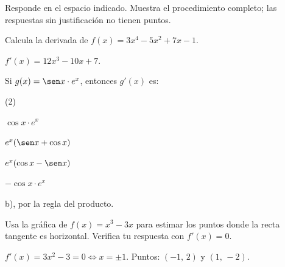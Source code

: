 \documentclass[11pt]{article}
\begin{document}
\encabezado

\begin{instrucciones}
Responde en el espacio indicado. Muestra el procedimiento completo;
las respuestas sin justificación no tienen puntos.
\end{instrucciones}

\begin{preguntas}

\pregunta[2] Calcula la derivada de $f(x) = 3x^4 - 5x^2 + 7x - 1$.
\begin{solucion}[3cm]
$f'(x) = 12x^3 - 10x + 7$.
\end{solucion}

\pregunta[1] Si $g(x) = \sen x \cdot e^{x}$, entonces $g'(x)$ es:
\begin{opciones*}(2)
  \item $\cos x \cdot e^{x}$
  \item $e^{x}(\sen x + \cos x)$
  \item $e^{x}(\cos x - \sen x)$
  \item $-\cos x \cdot e^{x}$
\end{opciones*}
\begin{solucion}
b), por la regla del producto.
\end{solucion}

\pregunta[2] Usa la gráfica de $f(x) = x^3 - 3x$ para estimar los puntos
donde la recta tangente es horizontal. Verifica tu respuesta con $f'(x)=0$.

\begin{center}
\end{center}
\begin{solucion}[3cm]
$f'(x) = 3x^2 - 3 = 0 \iff x = \pm 1$. Puntos: $(-1,\,2)$ y $(1,\,-2)$.
\end{solucion}

\end{preguntas}
\end{document}
